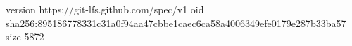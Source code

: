 version https://git-lfs.github.com/spec/v1
oid sha256:895186778331c31a0f94aa47cbbe1caec6ca58a4006349efe0179e287b33ba57
size 5872
